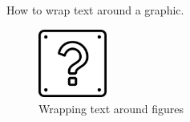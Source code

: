 \documentclass{beamer}
\begin{document}
\begin{frame}{How to wrap text around a graphic.}

\begin{figure}
  \centering
  \includegraphics[width=0.2\textwidth]{Ques.png}
  \caption{Wrapping text around figures}
\end{figure}

\small \blindtext
\end{frame}
\end{document}
